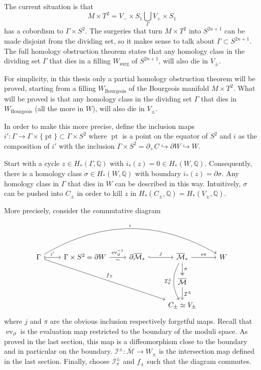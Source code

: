 The current situation is that 
\[
    M\times T^2 = V_- \times S_1 \bigcup_\Gamma V_+\times S_1
\] 
has a cobordism to $\Gamma \times S^2$.
The surgeries that turn $M\times T^2$ into $S^{2n+1}$ can be made disjoint from the dividing set, so it makes sense to talk about $\Gamma \subset S^{2n+1}$.
The full homology obstruction theorem states that any homology class in the dividing set $\Gamma$ that dies in a filling $W_\text{surg}$ of $S^{2n+1}$,
will also die in $V_\pm$.

For simplicity, in this thesis only a partial homology obstruction theorem will be proved, starting from a filling $W_\text{Bourgeois}$
of the Bourgeois manifold $M\times T^2$. What will be proved is that any homology class in the dividing set $\Gamma$ that dies in
$W_\text{Bourgeois}$ (all the more in $W$), will also die in $V_\pm$.

In order to make this more precise, define the inclusion maps
$i'\colon \Gamma \to \Gamma \times \{\operatorname{pt}\} \subset \Gamma \times S^2$ where $\operatorname{pt}$ is a point on the equator of $S^2$
and $i$ as the composition of $i'$ with the inclusion $\Gamma \times S^2 = \partial_+ C \hookrightarrow \partial W \hookrightarrow W$. 

Start with a cycle $z \in H_*(\Gamma, \mathbb Q)$ with $i_*(z) = 0 \in H_*(W, \mathbb{Q})$.
Consequently, there is a homology class $\sigma \in H_*(W, \mathbb Q)$ with boundary $i_*(z) = \partial \sigma$.
Any homology class in $\Gamma$ that dies in $W$ can be described in this way.
Intuitively, $\sigma$ can be pushed into $C_\pm$ in order to kill $z$ in $H_*(C_\pm, \mathbb{Q}) = H_*(V_\pm, \mathbb{Q})$.

More precisely, consider the commutative diagram
\[
\begin{tikzcd}
    \Gamma \arrow[r, hook, "i'"] \arrow[rrrr, bend left, "i"] \arrow[rrrdd, hook, "f_\pm"]
        & \Gamma \times S^2  = \partial W  \arrow[r, "\operatorname{ev}_\partial^{-1}", "\sim" below]
        & \partial \overline{\mathcal M}_* \arrow[r, hook, "j"]
        & \overline{\mathcal M}_*          \arrow[r, "\operatorname{ev}"] \arrow[d, twoheadrightarrow, "\pi"] \arrow[dd, bend right, "\mathcal I_\pi^\pm" left]
        & W \\
    &&& \overline{\mathcal M} \arrow[d, "\mathcal{I}^\pm"]  &   \\
    &&& C_\pm \simeq V_\pm                                  &   
\end{tikzcd}
\]
where $j$ and $\pi$ are the obvious inclusion respectively forgetful maps.
Recall that $\operatorname{ev}_\partial$ is the evaluation map restricted to the boundary of the moduli space. 
As proved in the last section, this map is a diffeomorphism close to the boundary and in particular on the boundary.
$\mathcal{I}^\pm\colon \overline{\mathcal{M}} \to W_\pm$ is the intersection map defined in the last section.
Finally, choose $\mathcal I_\pi^\pm$ and $f_\pm$ such that the diagram commutes.

